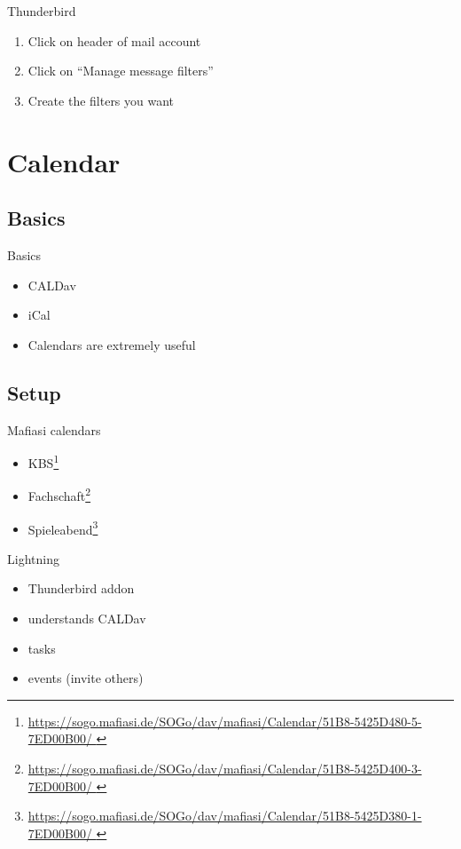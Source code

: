 \documentclass{beamer}
\begin{document}
	\begin{frame}{Thunderbird}
		\begin{enumerate}
			\item Click on header of mail account
			\item Click on ``Manage message filters''
			\item Create the filters you want
		\end{enumerate}
	\end{frame}
	
	\section{Calendar}
	\subsection{Basics}
	\begin{frame}{Basics}
		\begin{itemize}
			\item CALDav
			\item iCal
			\item Calendars are extremely useful
		\end{itemize}
	\end{frame}	
	
	\subsection{Setup}
	\begin{frame}{Mafiasi calendars}
		\begin{itemize}
			\item KBS\footnote{\url{ https://sogo.mafiasi.de/SOGo/dav/mafiasi/Calendar/51B8-5425D480-5-7ED00B00/ }}
			\item Fachschaft\footnote{\url{https://sogo.mafiasi.de/SOGo/dav/mafiasi/Calendar/51B8-5425D400-3-7ED00B00/ }}
			\item Spieleabend\footnote{\url{https://sogo.mafiasi.de/SOGo/dav/mafiasi/Calendar/51B8-5425D380-1-7ED00B00/ }}
		\end{itemize}
	\end{frame}	
	
	\begin{frame}{Lightning}
		\begin{itemize}
			\item Thunderbird addon
			\item understands CALDav
			\item tasks
			\item events (invite others)
		\end{itemize}
	\end{frame}
	
\end{document}
